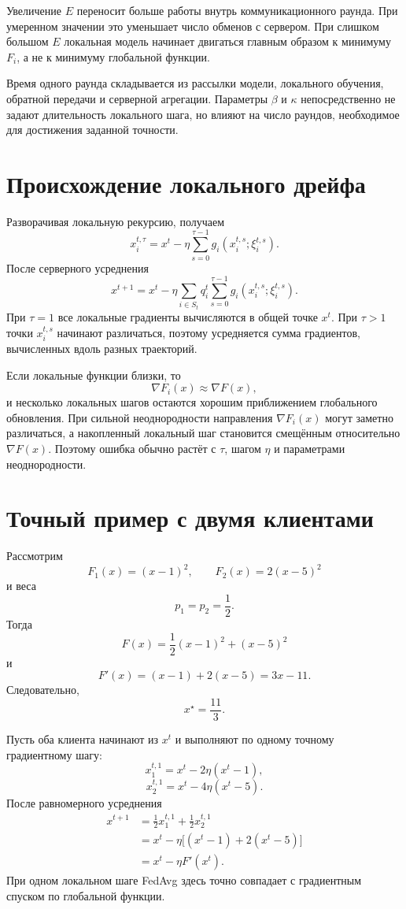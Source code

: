 Увеличение \(E\) переносит больше работы внутрь коммуникационного
раунда. При умеренном значении это уменьшает число обменов с сервером.
При слишком большом \(E\) локальная модель начинает двигаться главным
образом к минимуму \(F_i\), а не к минимуму глобальной функции.

Время одного раунда складывается из рассылки модели, локального
обучения, обратной передачи и серверной агрегации. Параметры
\(\beta\) и \(\kappa\) непосредственно не задают длительность
локального шага, но влияют на число раундов, необходимое для достижения
заданной точности.

\section{Происхождение локального дрейфа}

Разворачивая локальную рекурсию, получаем
\[
    x_i^{t,\tau}
    =
    x^t
    -
    \eta
    \sum_{s=0}^{\tau-1}
    g_i(x_i^{t,s};\xi_i^{t,s}).
\]
После серверного усреднения
\[
    x^{t+1}
    =
    x^t
    -
    \eta
    \sum_{i\in S_t}q_i^t
    \sum_{s=0}^{\tau-1}
    g_i(x_i^{t,s};\xi_i^{t,s}).
\]
При \(\tau=1\) все локальные градиенты вычисляются в общей точке
\(x^t\). При \(\tau>1\) точки \(x_i^{t,s}\) начинают различаться,
поэтому усредняется сумма градиентов, вычисленных вдоль разных
траекторий.

Если локальные функции близки, то
\[
    \nabla F_i(x)
    \approx
    \nabla F(x),
\]
и несколько локальных шагов остаются хорошим приближением глобального
обновления. При сильной неоднородности направления
\(\nabla F_i(x)\) могут заметно различаться, а накопленный локальный
шаг становится смещённым относительно \(\nabla F(x)\). Поэтому
ошибка обычно растёт с \(\tau\), шагом \(\eta\) и параметрами
неоднородности.

\section{Точный пример с двумя клиентами}

Рассмотрим
\[
    F_1(x)=(x-1)^2,
    \qquad
    F_2(x)=2(x-5)^2
\]
и веса
\[
    p_1=p_2=\frac12.
\]
Тогда
\[
    F(x)
    =
    \frac12(x-1)^2+(x-5)^2
\]
и
\[
    F'(x)
    =
    (x-1)+2(x-5)
    =
    3x-11.
\]
Следовательно,
\[
    x^\star=\frac{11}{3}.
\]

Пусть оба клиента начинают из \(x^t\) и выполняют по одному точному
градиентному шагу:
\[
    x_1^{t,1}
    =
    x^t-2\eta(x^t-1),
\]
\[
    x_2^{t,1}
    =
    x^t-4\eta(x^t-5).
\]
После равномерного усреднения
\[
\begin{aligned}
    x^{t+1}
    &=
    \frac12x_1^{t,1}
    +
    \frac12x_2^{t,1}
    \\
    &=
    x^t
    -
    \eta\bigl[(x^t-1)+2(x^t-5)\bigr]
    \\
    &=
    x^t-\eta F'(x^t).
\end{aligned}
\]
При одном локальном шаге FedAvg здесь точно совпадает с градиентным
спуском по глобальной функции.


